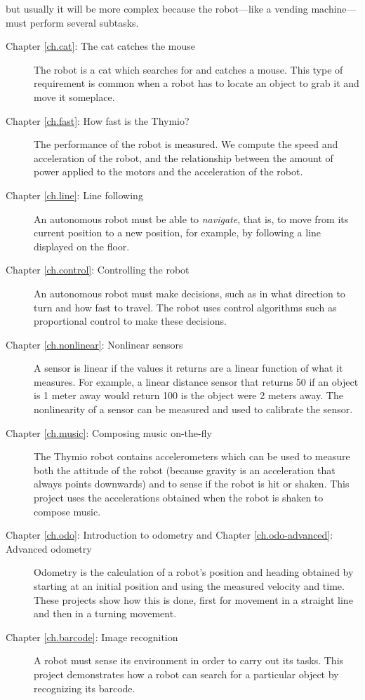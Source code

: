 but usually it will be more complex because the robot---like a vending
machine---must perform several subtasks.

\newpage
{}

\begin{description}

\item[Chapter \ref{ch.cat}: The cat catches the mouse] The robot is a
cat which searches for and catches a mouse. This type of requirement is
common when a robot has to locate an object to grab it and move it
someplace.

\item[Chapter \ref{ch.fast}: How fast is the Thymio?] The
performance of the robot is measured. We compute the speed and
acceleration of the robot, and the relationship between the amount of
power applied to the motors and the acceleration of the robot.

\item[Chapter \ref{ch.line}: Line following] An autonomous robot must be
able to \emph{navigate}, that is, to move from its current position to a
new position, for example, by following a line displayed on the floor.

\item[Chapter \ref{ch.control}: Controlling the robot] An autonomous
robot must make decisions, such as in what direction to turn and how
fast to travel. The robot uses control algorithms such as proportional
control to make these decisions.

\item[Chapter \ref{ch.nonlinear}: Nonlinear sensors] A sensor is linear
if the values it returns are a linear function of what it measures. For
example, a linear distance sensor that returns 50 if an object is 1
meter away would return 100 is the object were 2 meters away. The
nonlinearity of a sensor can be measured and used to calibrate the
sensor.

\item[Chapter \ref{ch.music}: Composing music on-the-fly] The Thymio
robot contains accelerometers which can be used to measure both the
attitude of the robot (because gravity is an acceleration that always
points downwards) and to sense if the robot is hit or shaken. This
project uses the accelerations obtained when the robot is shaken to
compose music.

\item[Chapter \ref{ch.odo}: Introduction to odometry and Chapter
\ref{ch.odo-advanced}: Advanced odometry] Odometry is the calculation of
a robot's position and heading obtained by starting at an initial
position and using the measured velocity and time. These projects show
how this is done, first for movement in a straight line and then in a
turning movement.

\item[Chapter \ref{ch.barcode}: Image recognition] A robot must sense
its environment in order to carry out its tasks. This project
demonstrates how a robot can search for a particular object by
recognizing its barcode.

\end{description}


